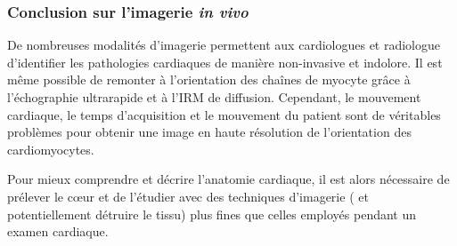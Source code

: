 


\subsubsection{Conclusion sur l’imagerie \textit{in vivo}}

De nombreuses modalités d’imagerie permettent aux cardiologues et radiologue d’identifier les pathologies cardiaques de manière non-invasive et indolore. Il est même possible de remonter à l’orientation des chaînes de myocyte grâce à l’échographie ultrarapide et à l’IRM de diffusion. Cependant, le mouvement cardiaque, le temps d’acquisition et le mouvement du patient sont de véritables problèmes pour obtenir une image en haute résolution de l’orientation des cardiomyocytes.

Pour mieux comprendre et décrire l’anatomie cardiaque, il est alors nécessaire de prélever le cœur et de l’étudier avec des techniques d’imagerie ( et potentiellement détruire le tissu) plus fines que celles employés pendant un examen cardiaque.

